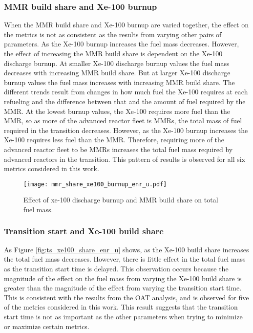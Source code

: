 \subsubsection{MMR build share and Xe-100 burnup}
When the \gls{MMR} build share and Xe-100 burnup are varied together, 
the effect on the metrics is not as consistent as the results from varying 
other pairs of parameters. As the Xe-100 burnup increases the fuel mass 
decreases. However, the effect of increasing the \gls{MMR} build share 
is dependent on the Xe-100 discharge burnup. At smaller Xe-100 discharge 
burnup values the fuel mass decreases with increasing \gls{MMR} build share. 
But at larger Xe-100 discharge burnup values the fuel mass increases 
with increasing \gls{MMR} build share. The different trends result from 
changes in how much fuel the Xe-100 requires at each refueling and 
the difference between that and the amount of fuel required by the \gls{MMR}.
At the lowest burnup values, the Xe-100 requires more fuel than the 
\gls{MMR}, so as more of the advanced reactor fleet is \glspl{MMR}, the 
total mass of fuel required in the transition decreases. However, as 
the Xe-100 burnup increases the Xe-100 requires less fuel than the 
\gls{MMR}. Therefore, requiring more of the advanced reactor fleet to be 
\glspl{MMR} increases the total fuel mass required by advanced reactors in 
the transition. This pattern of results is observed for all six metrics
considered in this work. 

\begin{figure}[h!]
    \centering
    \texttt{[image: mmr\_share\_xe100\_burnup\_enr\_u.pdf]}
    \caption{Effect of xe-100 discharge burnup and MMR build share 
    on total fuel mass.}
    \label{fig:mmr_share_xe100_burnup_enr_u}
\end{figure}


\subsubsection{Transition start and Xe-100 build share}
As Figure \ref{fig:ts_xe100_share_enr_u} shows, as the Xe-100 build 
share increases the total fuel mass decreases. However, there is little 
effect in the total fuel mass as the transition start time is delayed. This 
observation occurs because the magnitude of the effect on the fuel mass 
from varying the Xe-100 build share is greater than the magnitude of 
the effect from varying the transition start time. This is consistent 
with the results from the \gls{OAT} analysis, and is observed for five 
of the metrics considered in this work. This result suggests that the 
transition start time is not as important as the other parameters when 
trying to minimize or maximize certain metrics. 

